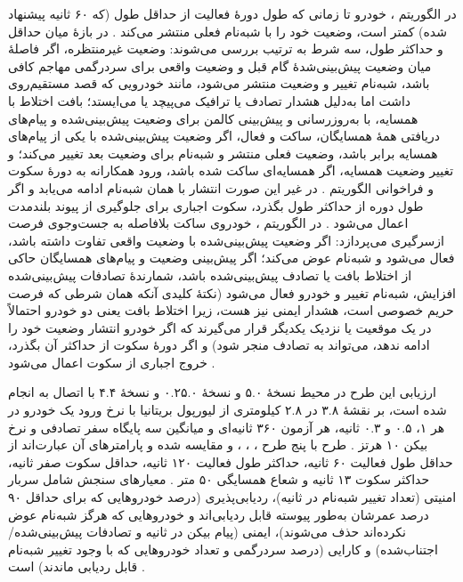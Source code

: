 \documentclass[12pt,a4paper]{article}
\begin{document}
در الگوریتم ، خودرو تا زمانی که طول دورهٔ فعالیت از حداقل طول (که ۶۰ ثانیه پیشنهاد شده) کمتر است، وضعیت خود را با شبه‌نام فعلی منتشر می‌کند \cite{al-aniPrivacySafetyImprovement2023}. در بازهٔ میان حداقل و حداکثر طول، سه شرط به ترتیب بررسی می‌شوند: وضعیت غیرمنتظره، اگر فاصلهٔ میان وضعیت پیش‌بینی‌شدهٔ گام قبل و وضعیت واقعی برای سردرگمی مهاجم کافی باشد، شبه‌نام تغییر و وضعیت منتشر می‌شود، مانند خودرویی که قصد مستقیم‌روی داشت اما به‌دلیل هشدار تصادف یا ترافیک می‌پیچد یا می‌ایستد؛ بافت اختلاط با همسایه، با به‌روزرسانی و پیش‌بینی کالمن برای وضعیت پیش‌بینی‌شده و پیام‌های دریافتی همهٔ همسایگان، ساکت و فعال، اگر وضعیت پیش‌بینی‌شده با یکی از پیام‌های همسایه برابر باشد، وضعیت فعلی منتشر و شبه‌نام برای وضعیت بعد تغییر می‌کند؛ و تغییر وضعیت همسایه، اگر همسایه‌ای ساکت شده باشد، ورود همکارانه به دورهٔ سکوت و فراخوانی الگوریتم  \cite{al-aniPrivacySafetyImprovement2023}. در غیر این صورت انتشار با همان شبه‌نام ادامه می‌یابد و اگر طول دوره از حداکثر طول بگذرد، سکوت اجباری برای جلوگیری از پیوند بلندمدت اعمال می‌شود \cite{al-aniPrivacySafetyImprovement2023}. در الگوریتم ، خودروی ساکت بلافاصله به جست‌وجوی فرصت ازسرگیری می‌پردازد: اگر وضعیت پیش‌بینی‌شده با وضعیت واقعی تفاوت داشته باشد، فعال می‌شود و شبه‌نام عوض می‌کند؛ اگر پیش‌بینی وضعیت و پیام‌های همسایگان حاکی از اختلاط بافت یا تصادف پیش‌بینی‌شده باشد، شمارندهٔ تصادفات پیش‌بینی‌شده افزایش، شبه‌نام تغییر و خودرو فعال می‌شود (نکتهٔ کلیدی آنکه همان شرطی که فرصت حریم خصوصی است، هشدار ایمنی نیز هست، زیرا اختلاط بافت یعنی دو خودرو احتمالاً در یک موقعیت یا نزدیک یکدیگر قرار می‌گیرند که اگر خودرو انتشار وضعیت خود را ادامه ندهد، می‌تواند به تصادف منجر شود) و اگر دورهٔ سکوت از حداکثر آن بگذرد، خروج اجباری از سکوت اعمال می‌شود \cite{al-aniPrivacySafetyImprovement2023}.

ارزیابی این طرح در محیط  نسخهٔ ۵.۰ و  نسخهٔ ۰.۲۵.۰ و  نسخهٔ ۴.۴ با اتصال  به  انجام شده است، بر نقشهٔ ۳.۸ در ۲.۸ کیلومتری از لیورپول بریتانیا با نرخ ورود یک خودرو در هر ۱، ۰.۵ و ۰.۳ ثانیه، هر آزمون ۳۶۰ ثانیه‌ای و میانگین سه پایگاه سفر تصادفی و نرخ بیکن ۱۰ هرتز \cite{al-aniPrivacySafetyImprovement2023}. طرح  با پنج طرح ، ، ،  و  مقایسه شده و پارامتر‌های آن عبارت‌اند از حداقل طول فعالیت ۶۰ ثانیه، حداکثر طول فعالیت ۱۲۰ ثانیه، حداقل سکوت صفر ثانیه، حداکثر سکوت ۱۳ ثانیه و شعاع همسایگی ۵۰ متر \cite{al-aniPrivacySafetyImprovement2023}. معیار‌های سنجش شامل سربار امنیتی (تعداد تغییر شبه‌نام در ثانیه)، ردیابی‌پذیری (درصد خودرو‌هایی که برای حداقل ۹۰ درصد عمرشان به‌طور پیوسته قابل ردیابی‌اند و خودرو‌هایی که هرگز شبه‌نام عوض نکرده‌اند حذف می‌شوند)، ایمنی (پیام بیکن در ثانیه و تصادفات پیش‌بینی‌شده/اجتناب‌شده) و کارایی (درصد سردرگمی و تعداد خودرو‌هایی که با وجود تغییر شبه‌نام قابل ردیابی ماندند) است \cite{al-aniPrivacySafetyImprovement2023}.
\end{document}
